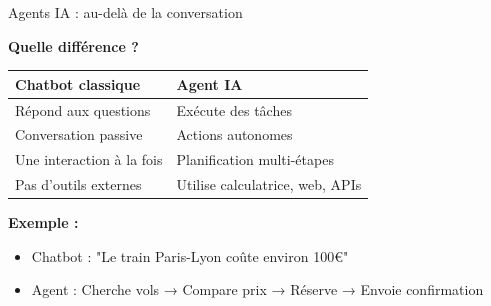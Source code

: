 \begin{frame}{Agents IA : au-delà de la conversation}

\textbf{Quelle différence ?}

\vspace{0.3cm}

\begin{tabular}{p{5cm}|p{5cm}}
\textbf{Chatbot classique} & \textbf{Agent IA} \\
\hline
Répond aux questions & Exécute des tâches \\
Conversation passive & Actions autonomes \\
Une interaction à la fois & Planification multi-étapes \\
Pas d'outils externes & Utilise calculatrice, web, APIs \\
\end{tabular}

\vspace{0.5cm}

\textbf{Exemple :}
\begin{itemize}
    \item Chatbot : "Le train Paris-Lyon coûte environ 100€"
    \item Agent : Cherche vols → Compare prix → Réserve → Envoie confirmation
\end{itemize}

\end{frame}

